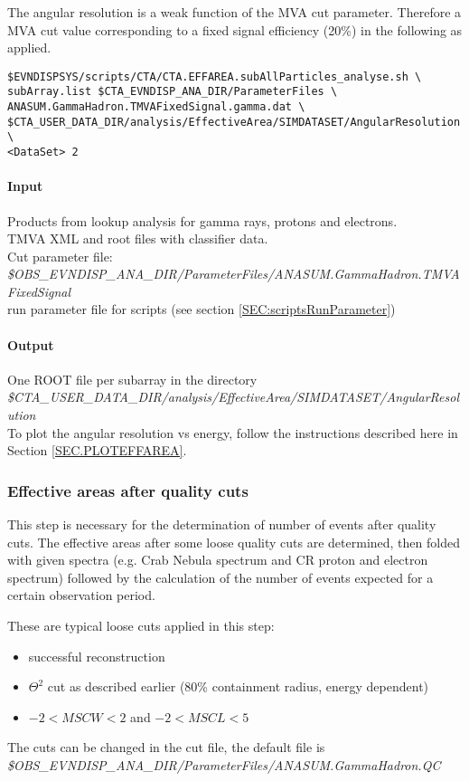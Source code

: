 \documentclass[titlepage,a4paper,twoside,11pt]{report}
\begin{document}
The angular resolution is a weak function of the MVA cut parameter. 
Therefore a MVA cut value corresponding to a fixed signal efficiency (20\%) 
in the following as applied.

\begin{lstlisting}
$EVNDISPSYS/scripts/CTA/CTA.EFFAREA.subAllParticles_analyse.sh \
subArray.list $CTA_EVNDISP_ANA_DIR/ParameterFiles \
ANASUM.GammaHadron.TMVAFixedSignal.gamma.dat \
$CTA_USER_DATA_DIR/analysis/EffectiveArea/SIMDATASET/AngularResolution \
<DataSet> 2
\end{lstlisting}

\paragraph{Input}
Products from lookup analysis for gamma rays, protons and electrons. \\
TMVA XML and root files with classifier data. \\
Cut parameter file: \\
{\it \$OBS\_EVNDISP\_ANA\_DIR/ParameterFiles/ANASUM.GammaHadron.TMVAFixedSignal}\\
run parameter file for scripts (see section \ref{SEC:scriptsRunParameter})

\paragraph{Output}

One ROOT file per subarray in the directory  \\
{\it \$CTA\_USER\_DATA\_DIR/analysis/EffectiveArea/SIMDATASET/AngularResolution} \\
To plot the angular resolution vs energy, follow the instructions described here in Section \ref{SEC.PLOTEFFAREA}.

\subsubsection{Effective areas after quality cuts}

This step is necessary for the determination of number of events after quality cuts. 
The effective areas after some loose quality cuts are determined, then folded with given spectra (e.g. Crab Nebula spectrum and CR proton and electron spectrum) followed by the calculation of the number of events expected for a certain observation period.

These are typical loose cuts applied in this step:
\begin{itemize}
\item successful reconstruction
\item $\Theta^2$ cut as described earlier (80\% containment radius, energy dependent)
\item $-2<MSCW<2$ and $-2<MSCL<5$
\end{itemize}
The cuts can be changed in the cut file, the default file is\\
{\it \$OBS\_EVNDISP\_ANA\_DIR/ParameterFiles/ANASUM.GammaHadron.QC}\\
\end{document}
